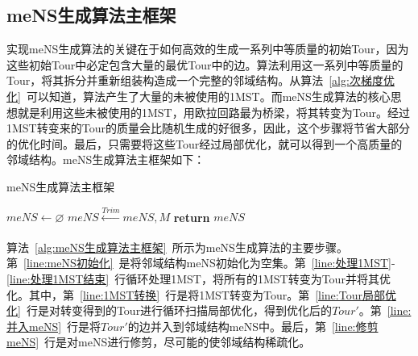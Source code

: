 \subsection{meNS生成算法主框架}
\label{subsec:NS_Method:邻域结构生成算法:meNS主框架}
实现meNS生成算法的关键在于如何高效的生成一系列中等质量的初始Tour，因为这些初始Tour中必定包含大量的最优Tour中的边。算法利用这一系列中等质量的Tour，将其拆分并重新组装构造成一个完整的邻域结构。从算法~\ref{alg:次梯度优化}~可以知道，算法产生了大量的未被使用的1MST。而meNS生成算法的核心思想就是利用这些未被使用的1MST，用欧拉回路最为桥梁，将其转变为Tour。经过1MST转变来的Tour的质量会比随机生成的好很多，因此，这个步骤将节省大部分的优化时间。最后，只需要将这些Tour经过局部优化，就可以得到一个高质量的邻域结构。meNS生成算法主框架如下：
\par
\begin{algorithm}[h]
    \caption{meNS生成算法主框架}
    \label{alg:meNS生成算法主框架}
    \BlankLine
    $meNS \leftarrow \varnothing$ \label{line:meNS初始化} \;
     \label{line:处理1MST结束}
    $meNS \xleftarrow[]{Trim} meNS, M$ \label{line:修剪meNS} \;
    \textbf{return } $meNS$ \;
\end{algorithm}
\par
算法~\ref{alg:meNS生成算法主框架}~所示为meNS生成算法的主要步骤。第~\ref{line:meNS初始化}~是将邻域结构meNS初始化为空集。第~\ref{line:处理1MST}-\ref{line:处理1MST结束}~行循环处理1MST，将所有的1MST转变为Tour并将其优化。其中，第~\ref{line:1MST转换}~行是将1MST转变为Tour。第~\ref{line:Tour局部优化}~行是对转变得到的Tour进行循环扫描局部优化，得到优化后的$Tour'$。第~\ref{line:并入meNS}~行是将$Tour'$的边并入到邻域结构meNS中。最后，第~\ref{line:修剪meNS}~行是对meNS进行修剪，尽可能的使邻域结构稀疏化。


